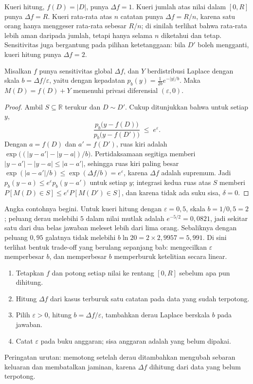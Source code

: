 Kueri hitung, $f(D)=|D|$, punya $\Delta f=1$. Kueri jumlah atas nilai dalam $[0,R]$
punya $\Delta f=R$. Kueri rata-rata atas $n$ catatan punya $\Delta f=R/n$, karena satu
orang hanya menggeser rata-rata sebesar $R/n$; di sinilah terlihat bahwa rata-rata lebih
aman daripada jumlah, tetapi hanya selama $n$ diketahui dan tetap. Sensitivitas juga
bergantung pada pilihan ketetanggaan: bila $D'$ boleh mengganti, kueri hitung punya
$\Delta f=2$.

\begin{teorema}
Misalkan $f$ punya sensitivitas global $\Delta f$, dan $Y$ berdistribusi Laplace dengan
skala $b=\Delta f/\varepsilon$, yaitu dengan kepadatan $p_b(y)=\frac{1}{2b}e^{-|y|/b}$.
Maka $M(D)=f(D)+Y$ memenuhi privasi diferensial $(\varepsilon,0)$.
\end{teorema}

\begin{proof}
Ambil $S\subseteq\mathbb{R}$ terukur dan $D\sim D'$. Cukup ditunjukkan bahwa untuk
setiap $y$,
\begin{equation}
\frac{p_b\bigl(y-f(D)\bigr)}{p_b\bigl(y-f(D')\bigr)} \;\le\; e^{\varepsilon}.
\end{equation}
Dengan $a=f(D)$ dan $a'=f(D')$, ruas kiri adalah $\exp\bigl((|y-a'|-|y-a|)/b\bigr)$.
Pertidaksamaan segitiga memberi $|y-a'|-|y-a|\le|a-a'|$, sehingga ruas kiri paling
besar $\exp(|a-a'|/b)\le\exp(\Delta f/b)=e^{\varepsilon}$, karena $\Delta f$ adalah
supremum. Jadi $p_b(y-a)\le e^{\varepsilon}p_b(y-a')$ untuk setiap $y$; integrasi kedua
ruas atas $S$ memberi $P[M(D)\in S]\le e^{\varepsilon}P[M(D')\in S]$, dan karena tidak
ada suku sisa, $\delta=0$.
\end{proof}

Angka contohnya begini. Untuk kueri hitung dengan $\varepsilon=0{,}5$, skala
$b=1/0{,}5=2$; peluang derau melebihi $5$ dalam nilai mutlak adalah $e^{-5/2}=0{,}0821$,
jadi sekitar satu dari dua belas jawaban meleset lebih dari lima orang. Sebaliknya
dengan peluang $0{,}95$ galatnya tidak melebihi $b\ln 20=2\times 2{,}9957=5{,}991$. Di
sini terlihat bentuk trade-off yang berulang sepanjang bab: mengecilkan $\varepsilon$
memperbesar $b$, dan memperbesar $b$ memperburuk ketelitian secara linear.

\begin{resep}
\begin{enumerate}
  \item Tetapkan $f$ dan potong setiap nilai ke rentang $[0,R]$ sebelum apa pun dihitung.
  \item Hitung $\Delta f$ dari kasus terburuk satu catatan pada data yang sudah terpotong.
  \item Pilih $\varepsilon>0$, hitung $b=\Delta f/\varepsilon$, tambahkan derau Laplace
        berskala $b$ pada jawaban.
  \item Catat $\varepsilon$ pada buku anggaran; sisa anggaran adalah yang belum dipakai.
\end{enumerate}
Peringatan urutan: memotong setelah derau ditambahkan mengubah sebaran keluaran dan
membatalkan jaminan, karena $\Delta f$ dihitung dari data yang belum terpotong.
\end{resep}

